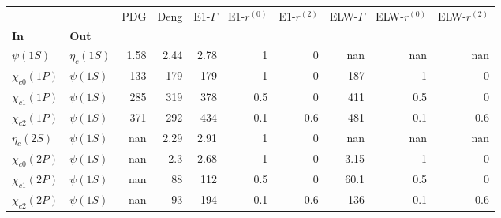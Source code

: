 \begin{tabular}{l|l|r|r|r|r|r|r|r|r}
\toprule
                &            &  PDG &  Deng &  E1-$\Gamma$ &  E1-$r^{(0)}$ &  E1-$r^{(2)}$ &  ELW-$\Gamma$ &  ELW-$r^{(0)}$ &  ELW-$r^{(2)}$ \\
\textbf{In} & \textbf{Out} &      &       &              &               &               &               &                &                \\
\midrule
\textbf{$\psi(1S)$} & \textbf{$\eta_{c}(1S)$} & 1.58 &  2.44 &         2.78 &             1 &             0 &           nan &            nan &            nan \\
\textbf{$\chi_{c0}(1P)$} & \textbf{$\psi(1S)$} &  133 &   179 &          179 &             1 &             0 &           187 &              1 &              0 \\
\textbf{$\chi_{c1}(1P)$} & \textbf{$\psi(1S)$} &  285 &   319 &          378 &           0.5 &             0 &           411 &            0.5 &              0 \\
\textbf{$\chi_{c2}(1P)$} & \textbf{$\psi(1S)$} &  371 &   292 &          434 &           0.1 &           0.6 &           481 &            0.1 &            0.6 \\
\textbf{$\eta_{c}(2S)$} & \textbf{$\psi(1S)$} &  nan &  2.29 &         2.91 &             1 &             0 &           nan &            nan &            nan \\
\textbf{$\chi_{c0}(2P)$} & \textbf{$\psi(1S)$} &  nan &   2.3 &         2.68 &             1 &             0 &          3.15 &              1 &              0 \\
\textbf{$\chi_{c1}(2P)$} & \textbf{$\psi(1S)$} &  nan &    88 &          112 &           0.5 &             0 &          60.1 &            0.5 &              0 \\
\textbf{$\chi_{c2}(2P)$} & \textbf{$\psi(1S)$} &  nan &    93 &          194 &           0.1 &           0.6 &           136 &            0.1 &            0.6 \\
\bottomrule
\end{tabular}
